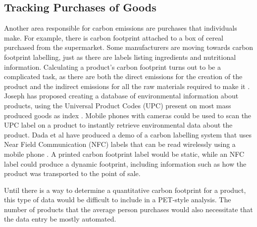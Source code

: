 \subsection{Tracking Purchases of Goods}

Another area responsible for carbon emissions are purchases that individuals make. For example, there is carbon footprint attached to a box of cereal purchased from the supermarket. Some manufacturers are moving towards carbon footprint labelling, just as there are labels listing ingredients and nutritional information. Calculating a product's carbon footprint turns out to be a complicated task, as there are both the direct emissions for the creation of the product and the indirect emissions for all the raw materials required to make it \cite{Wiedmann2007carbon-footprint}. Joseph has proposed creating a database of  environmental information about products, using the Universal Product Codes (UPC) present on most mass produced goods as index \cite{Joseph2008-personal-comm}. Mobile phones with cameras could be used to scan the UPC label on a product to instantly retrieve environmental data about the product. Dada et al have produced a demo of a carbon labelling system that uses Near Field Communication (NFC) labels that can be read wirelessly using a mobile phone \cite{dada-demo-pervasive-2008}. A printed carbon footprint label would be static, while an NFC label could produce a dynamic footprint, including information such as how the product was transported to the point of sale.

Until there is a way to determine a quantitative carbon footprint for a product, this type of data would be difficult to include in a PET-style analysis. The number of products that the average person purchases would also necessitate that the data entry be mostly automated.

%
%


